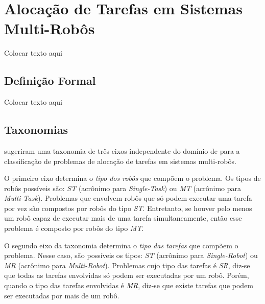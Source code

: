 \chapter[Alocação de Tarefas em Sistemas Multi-Robôs]{Alocação de Tarefas em Sistemas Multi-Robôs} \label{cap:cap3}
    
    Colocar texto aqui 
    
    \section{Definição Formal} \label{sec:sec3_1}
    Colocar texto aqui
    
    \section{Taxonomias} \label{sec:taxonomias}
        
         sugeriram uma taxonomia de três eixos independente do domínio de para a classificação de problemas de alocação de tarefas em sistemas multi-robôs. 
        
        O primeiro eixo determina o \textit{tipo dos robôs} que compõem o problema. Os tipos de robôs possíveis são: \textit{ST} (acrônimo para \textit{Single-Task}) ou \textit{MT} (acrônimo para \textit{Multi-Task}). Problemas que envolvem robôs que só podem executar uma tarefa por vez são compostos por robôs do tipo \textit{ST}. Entretanto, se houver pelo menos um robô capaz de executar mais de uma tarefa simultaneamente, então esse problema é composto por robôs do tipo \textit{MT}. 
        
        O segundo eixo da taxonomia determina o \textit{tipo das tarefas} que compõem o problema. Nesse caso, são possíveis os tipos: \textit{ST} (acrônimo para \textit{Single-Robot}) ou \textit{MR} (acrônimo para \textit{Multi-Robot}). Problemas cujo tipo das tarefas é \textit{SR}, diz-se que todas as tarefas envolvidas só podem ser executadas por um robô. Porém, quando o tipo das tarefas envolvidas é \textit{MR}, diz-se que existe tarefas que podem ser executadas por mais de um robô.
        
